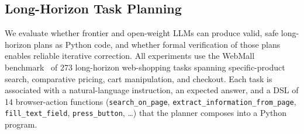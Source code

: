%
%

\subsection{Long-Horizon Task Planning}
\label{sec:long-horizon}

We evaluate whether frontier and open-weight LLMs can produce valid, safe
long-horizon plans as Python code, and whether formal verification of those
plans enables reliable iterative correction.  All experiments use the WebMall
benchmark~\citep{peeters2025webmall} of 273 long-horizon web-shopping tasks
spanning specific-product search, comparative pricing, cart manipulation, and
checkout.  Each task is associated with a natural-language instruction, an
expected answer, and a DSL of 14 browser-action functions (\texttt{search\_on\_page},
\texttt{extract\_information\_from\_page}, \texttt{fill\_text\_field},
\texttt{press\_button}, \ldots) that the planner composes into a Python
program.

